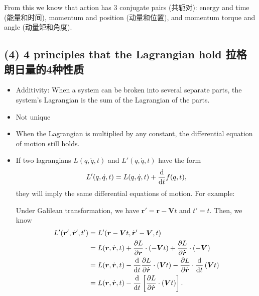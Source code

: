 From this we know that action has 3 conjugate pairs (共轭对): energy and
time (能量和时间), momentum and position (动量和位置), and momentum
torque and angle (动量矩和角度).

\subsection*{(4) 4 principles that the Lagrangian hold
拉格朗日量的4种性质}\label{principles-that-the-lagrangian-hold-ux62c9ux683cux6717ux65e5ux91cfux76844ux79cdux6027ux8d28}

\begin{itemize}
\tightlist{}
\item
  Additivity: When a system can be broken into several separate parts,
  the system's Lagrangian is the sum of the Lagrangian of the parts.
\item
  Not unique
\item
  When the Lagrangian is multiplied by any constant, the differential
  equation of motion still holds.
\item
  If two lagrangians \(L(q, \dot{q}, t)\) and \(L'(q, \dot{q}, t)\) have
  the form
  \[L'(q, \dot{q}, t) = L(q, \dot{q}, t) + {\mathrm{d} \over \mathrm{d} t}f(q, t),\]
  they will imply the same differential equations of motion. For
  example:

  Under Galilean transformation, we have
  \(\boldsymbol{r}' = \boldsymbol{r} - \boldsymbol{V}t\) and \(t' = t\).
  Then, we know \begin{align*}
        L'(\boldsymbol{r}', \dot{\boldsymbol{r}}', t') & = L'(\boldsymbol{r} - \boldsymbol{V}t, \dot{\boldsymbol{r}}' - \boldsymbol{V}, t) \\
        & = L(\boldsymbol{r}, \dot{\boldsymbol{r}}, t) + \dfrac{\partial L}{\partial \boldsymbol{r}} \cdot \left( - \boldsymbol{V} t \right) + \dfrac{\partial L}{\partial \dot{\boldsymbol{r}}} \cdot \left( - \boldsymbol{V} \right) \\
        & = L(\boldsymbol{r}, \dot{\boldsymbol{r}}, t) - {\mathrm{d} \over \mathrm{d} t} \dfrac{\partial L}{\partial \dot{\boldsymbol{r}}} \cdot \left( \boldsymbol{V} t \right) - \dfrac{\partial L}{\partial \dot{\boldsymbol{r}}} \cdot {\mathrm{d} \over \mathrm{d} t} \left( \boldsymbol{V} t \right) \\
        & = L(\boldsymbol{r}, \dot{\boldsymbol{r}}, t) - {\mathrm{d} \over \mathrm{d} t} \left[ \dfrac{\partial L}{\partial \dot{\boldsymbol{r}}} \cdot \left( \boldsymbol{V} t \right) \right].
    \end{align*}
\end{itemize}
